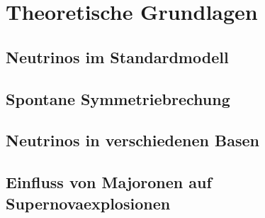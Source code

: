 \chapter{Theoretische Grundlagen}

\section{Neutrinos im Standardmodell}



\section{Spontane Symmetriebrechung}

\section{Neutrinos in verschiedenen Basen}

\section{Einfluss von Majoronen auf Supernovaexplosionen}

